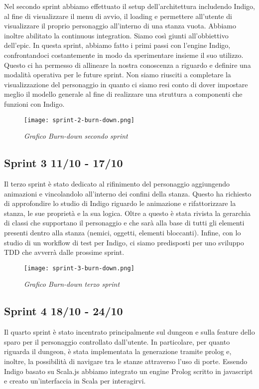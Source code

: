 Nel secondo sprint abbiamo effettuato il setup dell'architettura includendo Indigo, al fine di visualizzare il menu di avvio, il loading e permettere all'utente di visualizzare il proprio personaggio all'interno di una stanza vuota. 
Abbiamo inoltre abilitato la continuous integration. Siamo così giunti all'obbiettivo dell'epic. In questa sprint, abbiamo fatto i primi passi con l'engine Indigo, confrontandoci costantemente in modo da sperimentare insieme il suo utilizzo. Questo ci ha permesso di allineare la nostra conoscenza a riguardo e definire una modalità operativa per le future sprint. 
Non siamo riusciti a completare la visualizzazione del personaggio in quanto ci siamo resi conto di dover impostare meglio il modello generale al fine di realizzare una struttura a componenti che funzioni con Indigo.

\begin{figure}[!hbt]
    \centering
    \texttt{[image: sprint-2-burn-down.png]}
    \caption{\textit{Grafico Burn-down secondo sprint}} 
\end{figure}

\subsection{Sprint 3 11/10 - 17/10}

Il terzo sprint è stato dedicato al rifinimento del personaggio aggiungendo animazioni e vincolandolo all'interno dei confini della stanza. 
Questo ha richiesto di approfondire lo studio di Indigo riguardo le animazione e rifattorizzare la stanza, le sue proprietà e la sua logica. 
Oltre a questo è stata rivista la gerarchia di classi che supportano il personaggio e che sarà alla base di tutti gli elementi presenti dentro alla stanza (nemici, oggetti, elementi bloccanti).
Infine, con lo studio di un workflow di test per Indigo, ci siamo predisposti per uno sviluppo TDD che avverrà dalle prossime sprint.


\begin{figure}[!hbt]
    \centering
    \texttt{[image: sprint-3-burn-down.png]}
    \caption{\textit{Grafico Burn-down terzo sprint}} 
\end{figure}


\subsection{Sprint 4 18/10 - 24/10}
Il quarto sprint è stato incentrato principalmente sul dungeon e sulla feature dello sparo per il personaggio controllato dall'utente. 
In particolare, per quanto riguarda il dungeon, è stata implementata la generazione tramite prolog e, inoltre, la possibilità di navigare tra le stanze attraverso l'uso di porte. 
Essendo Indigo basato su Scala.js abbiamo integrato un engine Prolog scritto in javascript e creato un'interfaccia in Scala per interagirvi.

